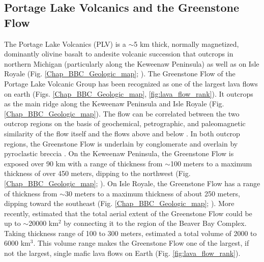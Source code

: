 \subsection{Portage Lake Volcanics and the Greenstone Flow}

The Portage Lake Volcanics (PLV) is a $\sim$5 km thick, normally magnetized, dominantly olivine basalt to andesite volcanic succession that outcrops in northern Michigan (particularly along the Keweenaw Peninsula) as well as on Isle Royale (Fig. \ref{Chap_BBC_Geologic_map}; \cite{Huber1973a, Cannon2001a, Green1982a}). The Greenstone Flow of the Portage Lake Volcanic Group has been recognized as one of the largest lava flows on earth (Figs. \ref{Chap_BBC_Geologic_map}, \ref{fig:lava_flow_rank}). It outcrops as the main ridge along the Keweenaw Peninsula and Isle Royale (Fig. \ref{Chap_BBC_Geologic_map}). The flow can be correlated between the two outcrop regions on the basis of geochemical, petrographic, and paleomagnetic similarity of the flow itself and the flows above and below \citep{Longo1984a}. In both outcrop regions, the Greenstone Flow is underlain by conglomerate and overlain by pyroclastic breccia \citep{Lane1911a, Huber1973a}. On the Keweenaw Peninsula, the Greenstone Flow is exposed over 90 km with a range of thickness from $\sim$100 meters to a maximum thickness of over 450 meters, dipping to the northwest (Fig. \ref{Chap_BBC_Geologic_map}; \cite{White1960a}). On Isle Royale, the Greenstone Flow has a range of thickness from $\sim$30 meters to a maximum thickness of about 250 meters, dipping toward the southeast (Fig. \ref{Chap_BBC_Geologic_map}; \cite{Huber1973a}). More recently, \cite{Doyle2016a} estimated that the total aerial extent of the Greenstone Flow could be up to $\sim$20000 km$^2$ by connecting it to the region of the Beaver Bay Complex. Taking thickness range of 100 to 300 meters, \cite{Doyle2016a} estimated a total volume of 2000 to 6000 km$^3$. This volume range makes the Greenstone Flow one of the largest, if not the largest, single mafic lava ﬂows on Earth (Fig. \ref{fig:lava_flow_rank}).

